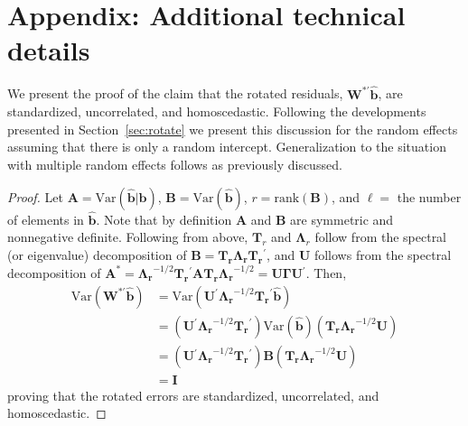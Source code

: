 \documentclass[12pt]{article} %
\newcommand{\trans}{\ensuremath{^\prime}}
\newcommand{\var}{\ensuremath{\mathrm{Var}}}
\begin{document}
\section*{Appendix: Additional technical details}

We present the proof of the claim that the rotated residuals, $\bm{W}^{*\prime} \widehat{\bm{b}}$, are standardized, uncorrelated, and homoscedastic. Following the developments presented in Section~\ref{sec:rotate} we present this discussion for the random effects assuming that there is only a random intercept. Generalization to the situation with multiple random effects follows as previously discussed.

\begin{proof}
 Let $\bm{A} = \var(\widehat{\bm{b}} | \bm{b})$, $\bm{B} = \var(\widehat{\bm{b}})$, $r = \text{rank}(\bm{B})$, and $\ell = $ the number of elements in $\widehat{\bm{b}}$. Note that by definition $\bm{A}$ and $\bm{B}$ are symmetric and nonnegative definite. Following from above, $\bm{T}_r$ and $\bm{\Lambda}_r$ follow from the spectral (or eigenvalue) decomposition of $\bm{B} = \bm{T_r \Lambda_r T_r}\trans$, and $\bm{U}$ follows from the spectral decomposition of $\bm{A^*} = \bm{\Lambda_r}^{-1/2} \bm{T_r}\trans \bm{A T_r \Lambda_r}^{-1/2} = \bm{U} \bm{\Gamma} \bm{U}\trans$. Then, 
\begin{align*}
\var(\bm{W}^{*\prime} \widehat{\bm{b}}) &= \var(\bm{U}\trans \bm{\Lambda_r}^{-1/2} \bm{T_r}\trans \widehat{\bm{b}})\\
&= (\bm{U}\trans \bm{\Lambda_r}^{-1/2} \bm{T_r}\trans) \var(\widehat{\bm{b}}) (\bm{T_r \Lambda_r}^{-1/2} \bm{U})\\
&= (\bm{U}\trans \bm{\Lambda_r}^{-1/2} \bm{T_r}\trans) \bm{B} (\bm{T_r \Lambda_r}^{-1/2} \bm{U})\\
&= \bm{I}
\end{align*}
proving that the rotated errors are standardized, uncorrelated, and homoscedastic.
\end{proof}
 
\end{document}
